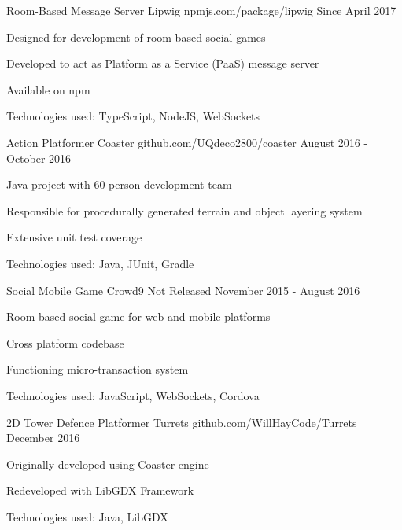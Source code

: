 \begin{cventries}
\cventry
{Room-Based Message Server} %
{Lipwig} %
{npmjs.com/package/lipwig} %
{Since April 2017} %
{ %
\begin{cvitems}
\item Designed for development of room based social games
\item Developed to act as Platform as a Service (PaaS) message server
\item Available on npm
\item Technologies used: TypeScript, NodeJS, WebSockets
\end{cvitems}
}

\cventry
{Action Platformer} %
{Coaster} %
{github.com/UQdeco2800/coaster} %
{August 2016 - October 2016} %
{ %
\begin{cvitems}
\item Java project with 60 person development team
\item Responsible for procedurally generated terrain and object layering system
\item Extensive unit test coverage
\item Technologies used: Java, JUnit, Gradle
\end{cvitems}
}

\cventry
{Social Mobile Game} %
{Crowd9} %
{Not Released} %
{November 2015 - August 2016} %
{ %
\begin{cvitems}
\item Room based social game for web and mobile platforms
\item Cross platform codebase
\item Functioning micro-transaction system
\item Technologies used: JavaScript, WebSockets, Cordova
\end{cvitems}
}

\cventry
{2D Tower Defence Platformer} %
{Turrets} %
{github.com/WillHayCode/Turrets} %
{December 2016} %
{ %
\begin{cvitems}
\item Originally developed using Coaster engine
\item Redeveloped with LibGDX Framework
\item Technologies used: Java, LibGDX
\end{cvitems}
}

\end{cventries}
